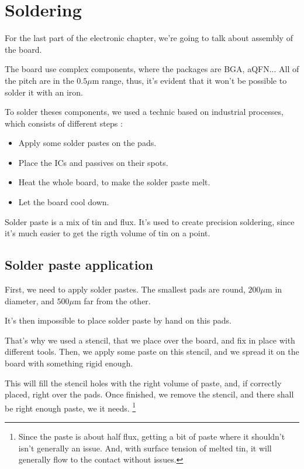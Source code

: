 \section{Soldering}\label{sec:assembly}
For the last part of the electronic chapter, we're going to talk about
assembly of the board.

The board use complex components, where the packages are BGA, aQFN...
All of the pitch are in the $0.5 \si{\mu\meter}$ range, thus, it's
evident that it won't be possible to solder it with an iron.

To solder theses components, we used a technic based on industrial
processes, which consists of different steps :

\begin{itemize}
    \item   Apply some solder pastes on the pads.
    \item   Place the ICs and passives on their spots.
    \item   Heat the whole board, to make the solder paste melt.
    \item   Let the board cool down.
\end{itemize}

Solder paste is a mix of tin and flux. It's used to create precision
soldering, since it's much easier to get the rigth volume of tin on a
point.

\subsection{Solder paste application}
First, we need to apply solder pastes. The smallest pads are round,
$200 \si{\mu\meter}$ in diameter, and $500 \si{\mu\meter}$ far from the
other.

It's then impossible to place solder paste by hand on this pads.

That's why we used a stencil, that we place over the board, and fix in
place with different tools. Then, we apply some paste on this stencil, and
we spread it on the board with something rigid enough.

This will fill the stencil holes with the right volume of paste, and, if
correctly placed, right over the pads. Once finished, we remove the stencil,
and there shall be right enough paste, we it needs. \footnote{
    Since the paste is about half flux, getting a bit of paste where it shouldn't
    isn't generally an issue. And, with surface tension of melted tin, it will
    generally flow to the contact without issues.
}

